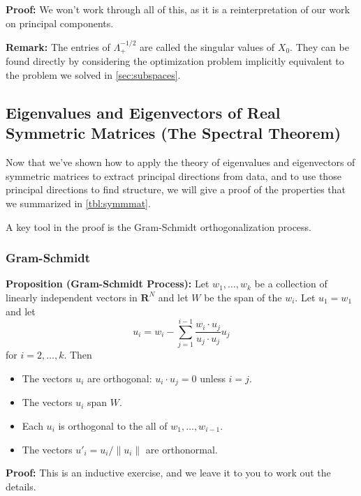 \documentclass[
]{article}
\providecommand{\tightlist}{%
  \setlength{\itemsep}{0pt}\setlength{\parskip}{0pt}}
\begin{document}
\textbf{Proof:} We won't work through all of this, as it is a
reinterpretation of our work on principal components.

\textbf{Remark:} The entries of \(\Lambda_{+}^{-1/2}\) are called the
singular values of \(X_{0}\). They can be found directly by considering
the optimization problem implicitly equivalent to the problem we solved
in \cref{sec:subspaces}.

\hypertarget{sec:spectraltheorem}{%
\subsection{Eigenvalues and Eigenvectors of Real Symmetric Matrices (The
Spectral Theorem)}\label{sec:spectraltheorem}}

Now that we've shown how to apply the theory of eigenvalues and
eigenvectors of symmetric matrices to extract principal directions from
data, and to use those principal directions to find structure, we will
give a proof of the properties that we summarized in \cref{tbl:symmmat}.

A key tool in the proof is the Gram-Schmidt orthogonalization process.

\hypertarget{sec:gsprocess}{%
\subsubsection{Gram-Schmidt}\label{sec:gsprocess}}

\textbf{Proposition (Gram-Schmidt Process):} Let \(w_{1},\ldots, w_{k}\)
be a collection of linearly independent vectors in \(\mathbf{R}^{N}\)
and let \(W\) be the span of the \(w_{i}\). Let \(u_{1} = w_{1}\) and
let \[
u_{i} = w_{i} - \sum_{j=1}^{i-1} \frac{w_{i}\cdot u_{j}}{u_{j}\cdot u_{j}}u_{j}
\] for \(i=2,\ldots, k\). Then

\begin{itemize}
\tightlist
\item
  The vectors \(u_{i}\) are orthogonal: \(u_{i}\cdot u_{j}=0\) unless
  \(i=j\).
\item
  The vectors \(u_{i}\) span \(W\).
\item
  Each \(u_{i}\) is orthogonal to the all of \(w_{1},\ldots, w_{i-1}\).
\item
  The vectors \(u'_{i} = u_{i}/\|u_{i}\|\) are orthonormal.
\end{itemize}

\textbf{Proof:} This is an inductive exercise, and we leave it to you to
work out the details.
\end{document}
